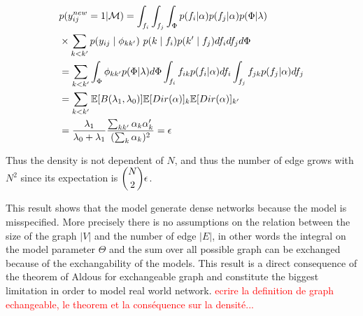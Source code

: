 \begin{align}
&p(y_{ij}^{new}=1| \mathcal{M}) = \int_{f_i} \int_{f_j} \int_{\Phi} p(f_i| \alpha ) p(f_j| \alpha)p(\Phi| \lambda) \\
&\times \sum_{k<k'} p(y_{ij} \mid \phi_{kk'})\ p(k\mid f_i)p(k'\mid f_j)df_i df_j d\Phi \\
&=  \sum_{k<k'} \int_{\Phi} \phi_{kk'} p(\Phi| \lambda) d\Phi \int_{f_i} f_{ik} p(f_i| \alpha )df_i \int_{f_j} f_{jk}  p(f_j| \alpha ) df_j \\
&= \sum_{k<k'} \mathbb{E}[B(\lambda_1, \lambda_0)] \mathbb{E}[Dir(\mathbf{\alpha} )]_k \mathbb{E}[Dir(\mathbf{\alpha})]_{k'} \\
&= \frac{\lambda_1}{\lambda_0+\lambda_1}\frac{\sum_{kk'} \alpha_k\alpha_k'}{(\sum_k \alpha_k)^2} = \epsilon
\end{align}


Thus the density is not dependent of $N$, and thus the number of edge grows with $N^2$ since its expectation is  $\dbinom{N}{2} \epsilon$.

This result shows that the model generate dense networks because the model is misspecified. More precisely there is no assumptions on the relation between the size of the graph $|V|$ and the number of edge $|E|$, in other words the integral on the model parameter $\Theta$ and the sum over all possible graph can be exchanged because of the exchangability of the models. This result is a direct consequence of the theorem of Aldous for exchangeable graph and constitute the biggest limitation in order to model real world network.
\textcolor{red}{ecrire la definition de graph echangeable, le theorem et la conséquence sur la densité...}

